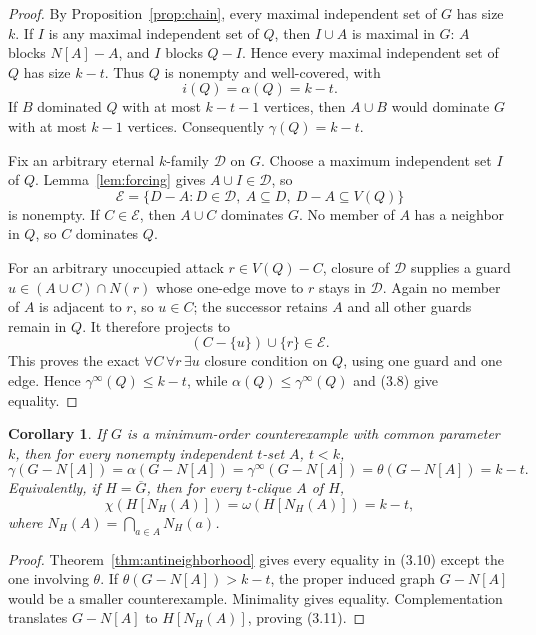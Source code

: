 \documentclass[11pt]{article}
\newtheorem{corollary}[theorem]{Corollary}
\theoremstyle{definition}
\theoremstyle{remark}
\newcommand{\gaminf}{\gamma^{\infty}}
\newcommand{\V}{V}
\begin{document}
\begin{proof}
By Proposition~\ref{prop:chain}, every maximal independent set of \(G\)
has size \(k\).  If \(I\) is any maximal independent set of \(Q\), then
\(I\cup A\) is maximal in \(G\): \(A\) blocks \(N[A]-A\), and \(I\)
blocks \(Q-I\).  Hence every maximal independent set of \(Q\) has size
\(k-t\).  Thus \(Q\) is nonempty and well-covered, with
\[
  i(Q)=\alpha(Q)=k-t.
\tag{3.8}
\]
If \(B\) dominated \(Q\) with at most \(k-t-1\) vertices, then
\(A\cup B\) would dominate \(G\) with at most \(k-1\) vertices.
Consequently \(\gamma(Q)=k-t\).

Fix an arbitrary eternal \(k\)-family \(\mathcal D\) on \(G\).  Choose a
maximum independent set \(I\) of \(Q\).  Lemma~\ref{lem:forcing} gives
\(A\cup I\in\mathcal D\), so
\[
 \mathcal E=
 \{D-A:D\in\mathcal D,\ A\subseteq D,\ D-A\subseteq\V(Q)\}
\tag{3.9}
\]
is nonempty.  If \(C\in\mathcal E\), then \(A\cup C\) dominates \(G\).
No member of \(A\) has a neighbor in \(Q\), so \(C\) dominates \(Q\).

For an arbitrary unoccupied attack \(r\in\V(Q)-C\), closure of
\(\mathcal D\) supplies a guard \(u\in(A\cup C)\cap N(r)\) whose one-edge
move to \(r\) stays in \(\mathcal D\).  Again no member of \(A\) is
adjacent to \(r\), so \(u\in C\); the successor retains \(A\) and all
other guards remain in \(Q\).  It therefore projects to
\[
  (C-\{u\})\cup\{r\}\in\mathcal E.
\]
This proves the exact
\(\forall C\,\forall r\,\exists u\) closure condition on \(Q\), using one
guard and one edge.  Hence \(\gaminf(Q)\leq k-t\), while
\(\alpha(Q)\leq\gaminf(Q)\) and (3.8) give equality.
\end{proof}

\begin{corollary}\label{cor:antineighborhood-minimal}
If \(G\) is a minimum-order counterexample with common parameter \(k\), then
for every nonempty independent \(t\)-set \(A\), \(t<k\),
\[
 \gamma(G-N[A])=\alpha(G-N[A])=\gaminf(G-N[A])
 =\theta(G-N[A])=k-t.
\tag{3.10}
\]
Equivalently, if \(H=\overline G\), then for every \(t\)-clique \(A\) of
\(H\),
\[
 \chi\!\left(H[N_H(A)]\right)
 =\omega\!\left(H[N_H(A)]\right)=k-t,
\tag{3.11}
\]
where \(N_H(A)=\bigcap_{a\in A}N_H(a)\).
\end{corollary}

\begin{proof}
Theorem~\ref{thm:antineighborhood} gives every equality in (3.10) except
the one involving \(\theta\).  If
\(\theta(G-N[A])>k-t\), the proper induced graph \(G-N[A]\) would be a
smaller counterexample.  Minimality gives equality.  Complementation
translates \(G-N[A]\) to \(H[N_H(A)]\), proving (3.11).
\end{proof}
\end{document}
